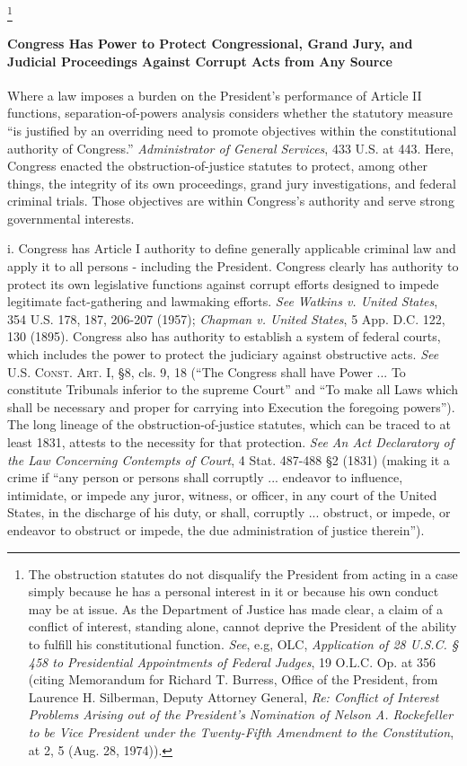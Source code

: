 \footnote{The obstruction statutes do not disqualify the President from acting in a case simply because he has a personal interest in it or because his own conduct may be at issue.
As the Department of Justice has made clear, a claim of a conflict of interest, standing alone, cannot deprive the President of the ability to fulfill his constitutional function.
\textit{See}, e.g, OLC, \textit{Application of 28 U.S.C. § 458 to Presidential Appointments of Federal Judges}, 19 O.L.C. Op. at 356 (citing Memorandum for Richard T. Burress, Office of the President, from Laurence H. Silberman, Deputy Attorney General, \textit{Re: Conflict of Interest Problems Arising out of the President's Nomination of Nelson A. Rockefeller to be Vice President under the Twenty-Fifth Amendment to the Constitution}, at 2, 5 (Aug. 28, 1974)).}

\paragraph{Congress Has Power to Protect Congressional, Grand Jury, and Judicial Proceedings Against Corrupt Acts from Any Source}

Where a law imposes a burden on the President’s performance of Article II functions, separation-of-powers analysis considers whether the statutory measure “is justified by an overriding need to promote objectives within the constitutional authority of Congress.”
\textit{Administrator of General Services}, 433 U.S. at 443.
Here, Congress enacted the obstruction-of-justice statutes to protect, among other things, the integrity of its own proceedings, grand jury investigations, and federal criminal trials.
Those objectives are within Congress’s authority and serve strong governmental interests.

i. Congress has Article I authority to define generally applicable criminal law and apply it to all persons - including the President.
Congress clearly has authority to protect its own legislative functions against corrupt efforts designed to impede legitimate fact-gathering and lawmaking efforts.
\textit{See Watkins v. United States}, 354 U.S. 178, 187, 206-207 (1957);
\textit{Chapman v. United States}, 5 App. D.C. 122, 130 (1895).
Congress also has authority to establish a system of federal courts, which includes the power to protect the judiciary against obstructive acts.
\textit{See} \textsc{U.S. Const. Art. I}, \S 8, cls. 9, 18 (“The Congress shall have Power ... To constitute Tribunals inferior to the supreme Court” and “To make all Laws which shall be necessary and proper for carrying into Execution the foregoing powers”).
The long lineage of the obstruction-of-justice statutes, which can be traced to at least 1831, attests to the necessity for that protection.
\textit{See An Act Declaratory of the Law Concerning Contempts of Court}, 4 Stat. 487-488 \S 2 (1831) (making it a crime if “any person or persons shall corruptly ... endeavor to influence, intimidate, or impede any juror, witness, or officer, in any court of the United States, in the discharge of his duty, or shall, corruptly ... obstruct, or impede, or endeavor to obstruct or impede, the due administration of justice therein”).

